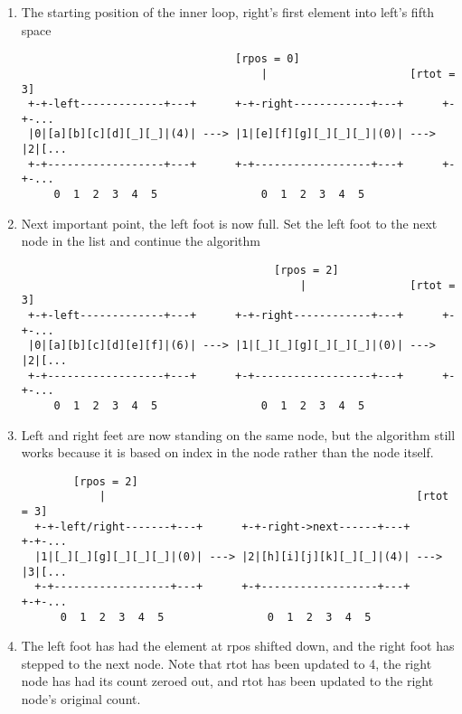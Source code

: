 \begin{enumerate}

	\item The starting position of the inner loop,  right's first
	      element into left's fifth space

	      \begin{verbatim}
                                 [rpos = 0]                           
                                     |                      [rtot = 3]
 +-+-left-------------+---+      +-+-right------------+---+      +-+-...
 |0|[a][b][c][d][_][_]|(4)| ---> |1|[e][f][g][_][_][_]|(0)| ---> |2|[...
 +-+------------------+---+      +-+------------------+---+      +-+-...
     0  1  2  3  4  5                0  1  2  3  4  5                 					
			 \end{verbatim}


	\item Next important point, the left foot is now full. Set the left foot
	      to the next node in the list and continue the algorithm
	      \begin{verbatim}
                                       [rpos = 2]                     
                                           |                [rtot = 3]
 +-+-left-------------+---+      +-+-right------------+---+      +-+-...
 |0|[a][b][c][d][e][f]|(6)| ---> |1|[_][_][g][_][_][_]|(0)| ---> |2|[... 
 +-+------------------+---+      +-+------------------+---+      +-+-...				
     0  1  2  3  4  5                0  1  2  3  4  5                 				
			 \end{verbatim}


	\item Left and right feet are now standing on the same node, but the
	      algorithm still works because it is based on index in the node
	      rather than the node itself.
	      \begin{verbatim}
        [rpos = 2]                                                     
            |                                                [rtot = 3]
  +-+-left/right-------+---+      +-+-right->next------+---+      +-+-... 
  |1|[_][_][g][_][_][_]|(0)| ---> |2|[h][i][j][k][_][_]|(4)| ---> |3|[... 					
  +-+------------------+---+      +-+------------------+---+      +-+-...					
      0  1  2  3  4  5                0  1  2  3  4  5                 				
		\end{verbatim}


	\item The left foot has had the element at rpos shifted down, and the
	      right foot has stepped to the next node. Note that rtot has been
	      updated to 4, the right node has had its count zeroed out, and
	      rtot has been updated to the right node's original count.



\end{enumerate}
